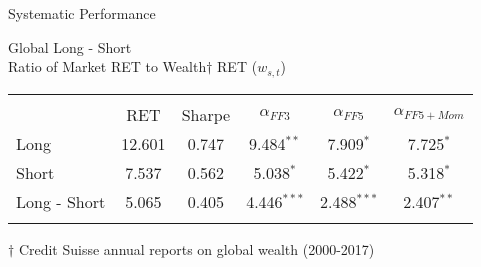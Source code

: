 \documentclass[handout]{beamer}
\begin{document}
\begin{frame}{Systematic Performance}
	\begin{center}
	Global Long - Short\\
	Ratio of Market RET to Wealth$\dagger$ RET ($w_{s,t}$)
	\end{center}
	\vspace{-6pt}
	\begin{adjustbox}{width=\textwidth}
		\begin{tabular}{lccccc}
			\hline\\[-1.8ex]
			& RET & Sharpe & $\alpha_{FF3}$ & $\alpha_{FF5}$ & $\alpha_{FF5+Mom}$ \\
			\cline{2-6}
			Long & 12.601 & 0.747 & 9.484$^{**}$ & 7.909$^{*}$ & 7.725$^{*}$ \\
			Short & 7.537 & 0.562 & 5.038$^{*}$ & 5.422$^{*}$ & 5.318$^{*}$ \\
			Long - Short & 5.065 & 0.405 & 4.446$^{***}$ & 2.488$^{***}$ & 2.407$^{**}$ \\
			\hline\\[-1.8ex]
		\end{tabular}
	\end{adjustbox}
	$\dagger$ Credit Suisse annual reports on global wealth (2000-2017)
\end{frame}
\end{document}
